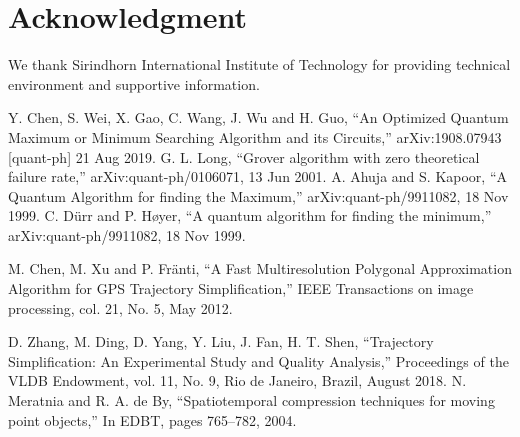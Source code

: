 \documentclass[conference]{IEEEtran}
\begin{document}
	
	\section*{Acknowledgment}
	
	We thank Sirindhorn International Institute of Technology for providing technical environment and supportive information.
	
	
	
	
	\begin{thebibliography}{00}
		 Y. Chen, S. Wei, X. Gao, C. Wang, J. Wu and H. Guo, ``An Optimized Quantum Maximum or Minimum Searching Algorithm and its Circuits,'' arXiv:1908.07943 [quant-ph] 21 Aug 2019.
		 G. L. Long, ``Grover algorithm with zero theoretical failure rate,''	arXiv:quant-ph/0106071, 13 Jun 2001.
		 A. Ahuja and S. Kapoor, ``A Quantum Algorithm for finding the Maximum,''	arXiv:quant-ph/9911082, 18 Nov 1999.
		 C. Dürr and P. Høyer, ``A quantum algorithm for finding the minimum,''	arXiv:quant-ph/9911082, 18 Nov 1999.
		
		 M. Chen, M. Xu and P. Fränti, ``A Fast Multiresolution Polygonal
		Approximation Algorithm for GPS
		Trajectory Simplification,'' IEEE Transactions on image processing, col. 21, No. 5, May 2012.
		
		 D. Zhang, M. Ding, D. Yang, Y. Liu, J. Fan, H. T. Shen, ``Trajectory Simplification: An Experimental Study and Quality Analysis,'' Proceedings of the VLDB Endowment, vol. 11, No. 9, Rio de Janeiro, Brazil, August 2018.
		 N. Meratnia and R. A. de By, ``Spatiotemporal compression techniques for moving point objects,'' In EDBT, pages 765–782, 2004.
		
		
		
		
	\end{thebibliography}
	
\end{document}
